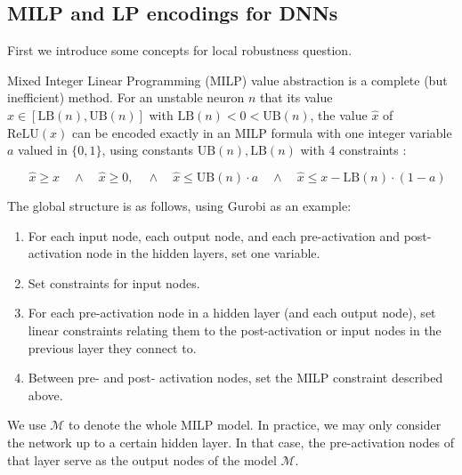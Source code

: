 \documentclass[letterpaper]{article} %
\newcommand{\UB}{\mathrm{UB}}
\newcommand{\LB}{\mathrm{LB}}
\newcommand{\ReLU}{\mathrm{ReLU}}
\begin{document}
	
	
	\subsection{MILP and LP encodings for DNNs}
	
	First we introduce some concepts for local robustness question.
	
	Mixed Integer Linear Programming (MILP) value abstraction is a complete (but inefficient) method. 
	For an unstable neuron $n$ that its value $x \in [\LB(n),\UB(n)]$ with $\LB(n)<0<\UB(n)$, the value $\hat{x}$ of $\ReLU(x)$ can be encoded exactly in an MILP formula with one 
	integer variable $a$ valued in $\{0,1\}$, using constants $\UB(n),\LB(n)$ with 4 constraints \cite{MILP}:
	
	\vspace{-0.4cm}
	\begin{equation}\quad \hat{x} \geq x \quad \wedge \quad \hat{x} \geq 0, \quad \wedge \quad \hat{x} \leq \UB(n) \cdot a \quad \wedge \quad \hat{x} \leq x-\LB(n) \cdot (1-a)
		\label{eq11}
	\end{equation}
	
	
	The global structure is as follows, using Gurobi as an example:
	\begin{enumerate}
		\item For each input node, each output node, and each pre-activation and post-activation node in the hidden layers,  set one variable. 
		\item Set constraints for input nodes.
		\item For each pre-activation node in a hidden layer (and each output node), set linear constraints relating them to the post-activation or input nodes in the previous layer they connect to.
		\item Between pre- and post- activation nodes, set the MILP constraint described above.
	\end{enumerate} We use $\mathcal{M}$ to denote the whole MILP model. In practice, we may only consider the network up to a certain hidden layer. In that case, the pre-activation nodes of that layer serve as the output nodes of the model $\mathcal{M}$.
	
\end{document}
